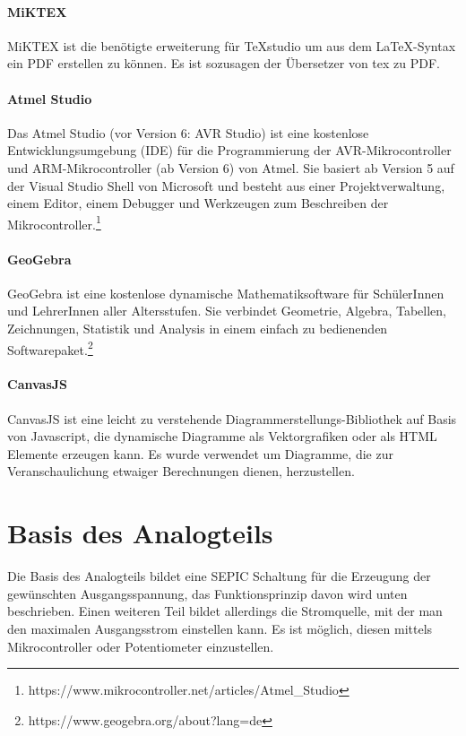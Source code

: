\documentclass[paper=a4, 12pt]{scrreprt}
\begin{document}
	\paragraph{MiKTEX}\hfill \break
	MiKTEX ist die benötigte erweiterung für TeXstudio um aus dem LaTeX-Syntax ein PDF erstellen zu können. Es ist sozusagen der Übersetzer von tex zu PDF. \newpage
	\paragraph{Atmel Studio}\hfill \break
	Das Atmel Studio (vor Version 6: AVR Studio) ist eine kostenlose Entwicklungsumgebung (IDE) für die Programmierung der AVR-Mikrocontroller und ARM-Mikrocontroller (ab Version 6) von Atmel. Sie basiert ab Version 5 auf der Visual Studio Shell von Microsoft und besteht aus einer Projektverwaltung, einem Editor, einem Debugger und Werkzeugen zum Beschreiben der Mikrocontroller.\footnote{https://www.mikrocontroller.net/articles/Atmel\_Studio}
	\paragraph{GeoGebra}\hfill \break
	GeoGebra ist eine kostenlose dynamische Mathematiksoftware für SchülerInnen und LehrerInnen aller Altersstufen. Sie verbindet Geometrie, Algebra, Tabellen, Zeichnungen, Statistik und Analysis in einem einfach zu bedienenden Softwarepaket.\footnote{https://www.geogebra.org/about?lang=de}
	\paragraph{CanvasJS}\hfill \break
	CanvasJS ist eine leicht zu verstehende Diagrammerstellungs-Bibliothek auf Basis von Javascript, die dynamische Diagramme als Vektorgrafiken oder als HTML Elemente erzeugen kann. Es wurde verwendet um Diagramme, die zur Veranschaulichung etwaiger Berechnungen dienen, herzustellen.
	\newpage
	
	\section{Basis des Analogteils}\hfill \break
	Die Basis des Analogteils bildet eine SEPIC Schaltung für die Erzeugung der gewünschten Ausgangsspannung, das Funktionsprinzip davon wird unten beschrieben. Einen weiteren Teil bildet allerdings die Stromquelle, mit der man den maximalen Ausgangsstrom einstellen kann. Es ist möglich, diesen mittels Mikrocontroller oder Potentiometer einzustellen.
\end{document}

